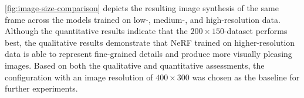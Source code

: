 \begin{comment}
\vspace{0.5cm}

\setlength{\tabcolsep}{12pt}
\renewcommand{\arraystretch}{1.2}
\begin{tabular}{l l}
\multicolumn{2}{c}{\textbf{Experiment setup - constant variables}} \\
\hline
Parameter & Value \\
\hline
\cellcolor{blue}Camera setup &\cellcolor{blue}Two cameras, $[-10^{\circ}, 10^{\circ}]$ yaw  \\
\cellcolor{blue}Distance &\cellcolor{blue}4 turns \\
\cellcolor{blue}Ticks per image &\cellcolor{blue}Capture data every 2$^{\text{nd}}$ tick \\
Speed & 100\% (default: 30km/h) \\
\hline
\end{tabular}
\caption[Constant parameters for experiment 1.4.]{Overview of the values of the parameters that remained constant across the experiments' runs.}
\label{tab:exp-image-resolution-stable-variables}
\end{comment}

\autoref{fig:image-size-comparison} depicts the resulting image synthesis of the same frame across the models trained on low-, medium-, and high-resolution data. Although the quantitative results indicate that the $200 \times 150$-dataset performs best, the qualitative results demonstrate that NeRF trained on higher-resolution data is able to represent fine-grained details and produce more visually pleasing images. Based on both the qualitative and quantitative assessments, the configuration with an image resolution of $400 \times 300$ was chosen as the baseline for further experiments.


\clearpage








